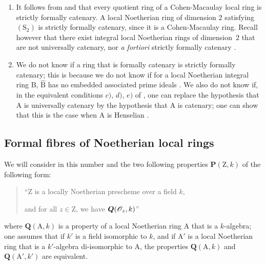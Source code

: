 \begin{remarks}[7.2.10]
\label{IV.7.2.10}
\begin{enumerate}[label=\emph{\roman*)}]
  \item It follows from  and  that every quotient ring of a Cohen-Macaulay local ring is strictly formally catenary.
  A local Noetherian ring of dimension $2$ satisfying $(\mathrm{S}_2)$ is strictly formally catenary, since it is a Cohen-Macaulay ring.
  Recall however that there exist integral local Noetherian rings of dimension~$2$ that are not universally catenary, nor \emph{a fortiori} strictly formally catenary .

  \item We do not know if a ring that is formally catenary  is strictly formally catenary; this is because we do not know if for a local Noetherian integral ring $\mathrm{B}$, $\widehat{\mathrm{B}}$ has no embedded associated prime ideals .
  We also do not know if, in the equivalent conditions $c)$, $d)$, $e)$ of , one can replace the hypothesis that $\mathrm{A}$ is universally catenary by the hypothesis that $\mathrm{A}$ is catenary; one can show that this is the case when $\mathrm{A}$ is Henselian .
\end{enumerate}
\end{remarks}


\subsection{Formal fibres of Noetherian local rings}
\label{subsection:IV.7.3}

\begin{env}[7.3.1]
\label{IV.7.3.1}
We will consider in this number and the two following properties $\boldsymbol{P}(\mathrm{Z},k)$ of the following form:
\begin{quote}
``$\mathrm{Z}$ is a locally Noetherian prescheme over a field $k$,

and for all $z\in\mathrm{Z}$, we have $\boldsymbol{Q}(\mathscr{O}_z,k)$''
\end{quote}
where $\boldsymbol{Q}(\mathrm{A},k)$ is a property of a local Noetherian ring $\mathrm{A}$ that is a $k$-algebra; one assumes that if $k'$ is a field isomorphic to $k$, and if $\mathrm{A}'$ is a local Noetherian ring that is a $k'$-algebra di-isomorphic to $\mathrm{A}$, the properties $\boldsymbol{Q}(\mathrm{A},k)$ and $\boldsymbol{Q}(\mathrm{A}',k')$ are equivalent.
\end{env}

